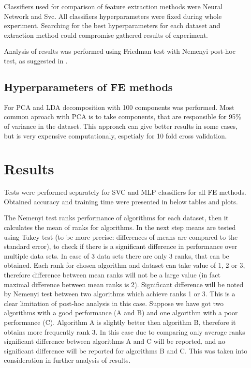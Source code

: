 \documentclass[a4paper, 10 pt, conference]{ieeeconf}
\begin{document}
Classifiers used for comparison of feature extraction methods were Neural Network and Svc. All classifiers hyperparameters were fixed during whole experiment. Searching for the best hyperparameters for each dataset and extraction method could compromise gathered results of experiment.

Analysis of results was performed using Friedman test with Nemenyi post-hoc test, as suggested in \cite{demsar}.

\subsection{Hyperparameters of FE methods}

For PCA and LDA decomposition with 100 components was performed. Most common aproach with PCA is to take components, that are responsible for 95\% of variance in the dataset. This approach can give better results in some cases, but is very expensive computationaly, espetialy for 10 fold cross validation. 


\section{Results}

Tests were performed separately for SVC and MLP classifiers for all FE methods. Obtained accuracy and training time were presented in below tables and plots.

The Nemenyi test ranks performance of algorithms for each dataset, then it calculates the mean of ranks for algorithms. In the next step means are tested using Tukey test (to be more precise: differences of means are compared to the standard error), to check if there is a significant difference in performance over multiple data sets. In case of 3 data sets there are only 3 ranks, that can be obtained. Each rank for chosen algorithm and dataset can take value of 1, 2 or 3, therefore difference between mean ranks will not be a large value (in fact maximal difference between mean ranks is 2). Significant difference will be noted by Nemenyi test between two algorithms which achieve ranks 1 or 3. This is a clear limitation of post-hoc analysis in this case. Suppose we have got two algorithms with a good performance (A and B) and one algorithm with a poor performance (C). Algorithm A is slightly better then algorithm B, therefore it obtains more frequently rank 3. In this case due to comparing only average ranks significant difference between algorithms A and C will be reported, and no significant difference will be reported for algorithms B and C. This was taken into consideration in further analysis of results.
\end{document}
